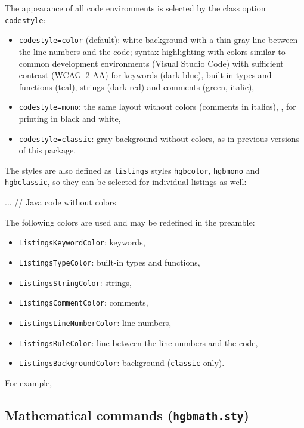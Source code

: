 \documentclass[language=english]{hgbarticle}
\begin{document}
The appearance of all code environments is selected by the class option \texttt{codestyle}:
%
\begin{itemize}
	\item \texttt{codestyle=color} (default): white background with a thin gray line between the line
		numbers and the code; syntax highlighting with colors similar to common development environments
		(Visual Studio Code) with sufficient contrast (WCAG~2 AA) for keywords (dark blue), built-in types
		and functions (teal), strings (dark red) and comments (green, italic),
	\item \texttt{codestyle=mono}: the same layout without colors (comments in italics), \eg, for printing
		in black and white,
	\item \texttt{codestyle=classic}: gray background without colors, as in previous versions of this
		package.
\end{itemize}
%
The styles are also defined as \texttt{listings} styles \texttt{hgbcolor}, \texttt{hgbmono} and
\texttt{hgbclassic}, so they can be selected for individual listings as well:
%
\begin{LaTeXCode}[numbers=none]
    \begin{JavaCode}[style=hgbmono]
    ... // Java code without colors
    \end{JavaCode}
\end{LaTeXCode}
%
The following colors are used and may be redefined in the preamble:
%
\begin{itemize}
	\item \texttt{ListingsKeywordColor}: keywords,
	\item \texttt{ListingsTypeColor}: built-in types and functions,
	\item \texttt{ListingsStringColor}: strings,
	\item \texttt{ListingsCommentColor}: comments,
	\item \texttt{ListingsLineNumberColor}: line numbers,
	\item \texttt{ListingsRuleColor}: line between the line numbers and the code,
	\item \texttt{ListingsBackgroundColor}: background (\texttt{classic} only).
\end{itemize}
%
For example,
%
\begin{LaTeXCode}[numbers=none]
\end{LaTeXCode}


\subsection{Mathematical commands (\texttt{hgbmath.sty})}
\end{document}
